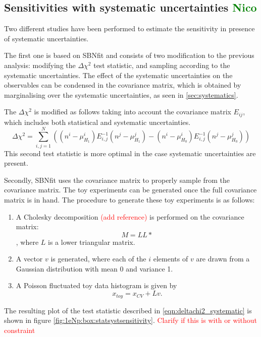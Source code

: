 \documentclass[a4paper]{article}
\begin{document}
\subsection{Sensitivities with systematic uncertainties \textcolor{green}{Nico}}
\label{subsec:sensitivity_syst_uncertainty}
Two different studies have been performed to estimate the sensitivity in presence of systematic uncertainties.

The first one is based on SBNfit and consists of two modification to the previous analysis: modifying the $\Delta \chi^2$ test statistic, and sampling according to the systematic uncertainties.
The effect of the systematic uncertainties on the observables can be condensed in the covariance matrix, which is obtained by marginalising over the systematic uncertainties, as seen in \ref{sec:systematics}.

The $\Delta \chi^2$ is modified as follows taking into account the covariance matrix $E_{ij}$, which includes both statistical and systematic uncertainties.
\begin{equation}
\label{eqn:deltachi2_systematic}
\Delta\chi^2 = \sum_{i,j=1}^{N}\left( (n^i - \mu^i_{H_1})E_{i,j}^{-1}(n^j - \mu^j_{H_1}) - (n^i - \mu^i_{H_0})E_{i,j}^{-1}(n^j - \mu^j_{H_0})\right)
\end{equation}
This second test statistic is more optimal in the case systematic uncertainties are present.

Secondly, SBNfit uses the covariance matrix to properly sample from the covariance matrix.
The toy experiments can be generated once the full covariance matrix is in hand. The procedure to generate these toy experiments is as follows:
\begin{enumerate}
    \item A Cholesky decomposition \textcolor{red}{(add reference)} is performed on the covariance matrix: $$M = LL*$$,
    where $L$ is a lower triangular matrix.
    \item A vector $v$ is generated, where each of the $i$ elements of $v$ are drawn from a Gaussian distribution with mean 0 and variance 1.
    \item A Poisson fluctuated toy data histogram is given by
$$x_{toy} = x_{CV} + Lv.$$
\end{enumerate}

The resulting plot of the test statistic described in \ref{eqn:deltachi2_systematic} is shown in figure \ref{fig:1eNp:box:statsystsensitivity}. \textcolor{red}{Clarify if this is with or without constraint}
\end{document}

